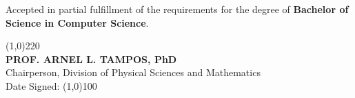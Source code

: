 \begin{titlepage}

    \begin{justify}
        \qquad Accepted in partial fulfillment of the requirements for the degree of \textbf{Bachelor of Science in Computer Science}.
    \end{justify}

    \centering
    \line(1,0){220}\\
    \textbf{PROF. ARNEL L. TAMPOS, PhD}\\
    Chairperson, Division of Physical Sciences and Mathematics\\
    Date Signed: \line(1,0){100}

\end{titlepage}



